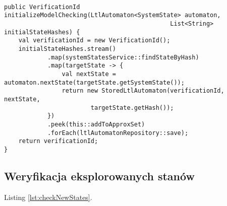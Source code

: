 \begin{minipage}{\linewidth}
\begin{lstlisting}[caption={Kod obsługujący inicjację weryfikacji modelowej.},captionpos=b,label={lst:initializeModelChecking}]

public VerificationId initializeModelChecking(LtlAutomaton<SystemState> automaton,
                                              List<String> initialStateHashes) {
    val verificationId = new VerificationId();
    initialStateHashes.stream()
            .map(systemStatesService::findStateByHash)
            .map(targetState -> {
                val nextState = automaton.nextState(targetState.getSystemState());
                return new StoredLtlAutomaton(verificationId, nextState,
                        targetState.getHash());
            })
            .peek(this::addToApproxSet)
            .forEach(ltlAutomatonRepository::save);
    return verificationId;
}

\end{lstlisting}
\end{minipage}


\subsection{Weryfikacja eksplorowanych stanów}


Listing \ref{lst:checkNewStates}.

